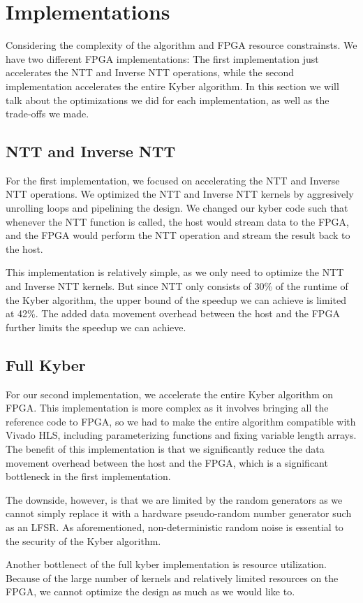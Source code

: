 
\section*{Implementations}

Considering the complexity of the algorithm and FPGA resource constrainsts.
We have two different FPGA implementations: The first implementation just accelerates the NTT and Inverse
NTT operations, while the second implementation accelerates the entire Kyber algorithm.
In this section we will talk about the optimizations we did for each implementation, as well as the trade-offs we made.

\subsection*{NTT and Inverse NTT}
For the first implementation, we focused on accelerating the NTT and Inverse NTT operations.
We optimized the NTT and Inverse NTT kernels by aggresively unrolling loops and pipelining the design.
We changed our kyber code such that whenever the NTT function is called, the host would stream data to the FPGA,
and the FPGA would perform the NTT operation and stream the result back to the host.

This implementation is relatively simple, as we only need to optimize the NTT and Inverse NTT kernels. But since NTT
only consists of 30\% of the runtime of the Kyber algorithm, the upper bound of the speedup we can achieve is limited
at 42\%. The added data movement overhead between the host and the FPGA further limits the speedup we can achieve.

\subsection*{Full Kyber}
For our second implementation, we accelerate the entire Kyber algorithm on FPGA.
This implementation is more complex as it involves bringing all the reference code to FPGA,
so we had to make the entire algorithm compatible with Vivado HLS, including parameterizing
functions and fixing variable length arrays. The benefit of this implementation is that we significantly reduce the data
movement overhead between the host and the FPGA, which is a significant bottleneck in the first implementation.

The downside, however, is that we are limited by the random generators as we cannot simply replace it with a hardware
pseudo-random number generator such as an LFSR. As aforementioned, non-deterministic random noise is essential to the
security of the Kyber algorithm.

Another bottlenect of the full kyber implementation is resource utilization. Because of the large number of kernels
and relatively limited resources on the FPGA,
we cannot optimize the design as much as we would like to.